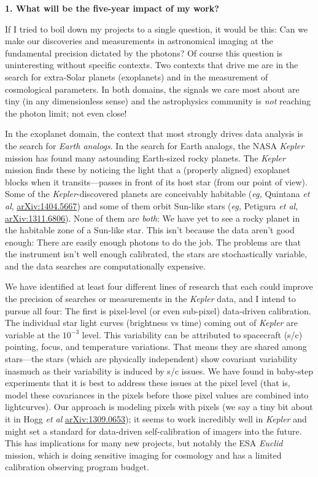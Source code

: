 \documentclass[11pt, letterpaper]{article}
\newcommand{\arxiv}[1]{\href{http://arxiv.org/abs/#1}{arXiv:#1}}
\begin{document}
\sloppy\sloppypar

\noindent\textbf{1. What will be the five-year impact of my work?}
\smallskip

If I tried to boil down my projects to a single question, it would be
this:
Can we make our discoveries and measurements in astronomical imaging
at the fundamental precision dictated by the photons?
Of course this question is uninteresting without specific contexts.
Two contexts that drive me are in the search for extra-Solar planets
(exoplanets) and in the measurement of cosmological parameters.
In both domains, the signals we care most about are tiny (in any
dimensionless sense) and the astrophysics community is \emph{not}
reaching the photon limit; not even close!

In the exoplanet domain, the context that most strongly drives data
analysis is the search for \emph{Earth analogs}.
In the search for Earth analogs, the NASA \textsl{Kepler} mission has
found many astounding Earth-sized rocky planets.
The \textsl{Kepler} mission finds these by noticing the light that a
(properly aligned) exoplanet blocks when it transits---passes in front
of its host star (from our point of view).
Some of the \textsl{Kepler}-discovered planets are conceivably habitable
(\textit{eg,} Quintana \textit{et al}, \arxiv{1404.5667})
and some of them orbit Sun-like stars
(\textit{eg,} Petigura \textit{et al}, \arxiv{1311.6806}).
None of them are \emph{both}: We have yet to see a rocky planet in the
habitable zone of a Sun-like star.
This isn't because the data aren't good enough:
There are easily enough photons to do the job.
The problems are that the instrument isn't well enough calibrated, the
stars are stochastically variable, and the data searches are
computationally expensive.

We have identified at least four different lines of research that each
could improve the precision of searches or measurements in the
\textsl{Kepler} data, and I intend to pursue all four:
The first is pixel-level (or even sub-pixel) data-driven calibration.
The individual star light curves (brightness vs time) coming out of
\textsl{Kepler} are variable at the $10^{-3}$ level.
This variability can be attributed to spacecraft (s/c) pointing,
focus, and temperature variations.
That means they are shared among stars---the stars (which are
physically independent) show covariant variability inasmuch as their
variability is induced by s/c issues.
We have found in baby-step experiments that it is best to address
these issues at the pixel level (that is, model these covariances in
the pixels before those pixel values are combined into lightcurves).
Our approach is modeling pixels with pixels
(we say a tiny bit about it in Hogg \textit{et al} \arxiv{1309.0653});
it seems to work
incredibly well in \textsl{Kepler} and might set a standard for
data-driven self-calibration of imagers into the future.
This has implications for many new projects, but notably the ESA
\textsl{Euclid} mission, which is doing sensitive imaging for
cosmology and has a limited calibration observing program budget.
\end{document}
